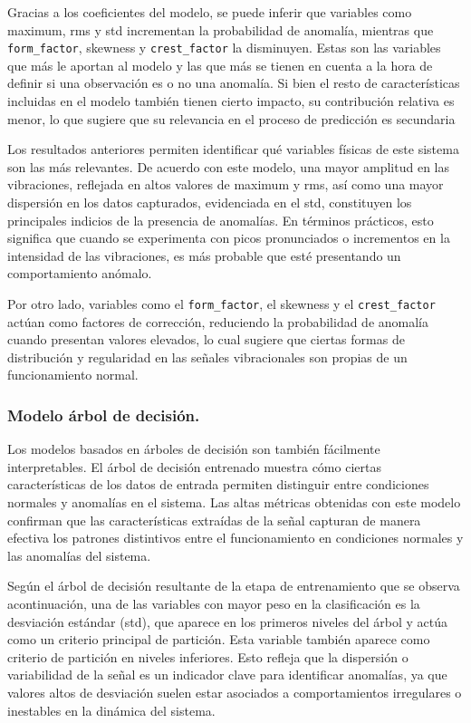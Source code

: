 \documentclass[11pt,a4paper,spanish]{book}
\numberwithin{equation}{chapter}
\numberwithin{figure}{chapter}
\begin{document}
Gracias a los coeficientes del modelo, se puede inferir que variables como maximum, rms 
y std incrementan la probabilidad de anomalía, mientras que \lstinline|form_factor|, 
skewness y \lstinline|crest_factor| la disminuyen. 
Estas son las variables que más le aportan al modelo y las que más se tienen en cuenta 
a la hora de definir si una observación es o no una anomalía. Si bien el resto de 
características incluidas en el modelo también tienen cierto impacto, su contribución 
relativa es menor, lo que sugiere que su relevancia en el proceso de predicción es 
secundaria


Los resultados anteriores permiten identificar qué variables físicas de este sistema son 
las más relevantes. De acuerdo con este modelo, una mayor amplitud en las vibraciones, 
reflejada en altos valores de maximum y rms, así como una mayor dispersión en los datos 
capturados, evidenciada en el std, constituyen los principales indicios de la presencia 
de anomalías. En términos prácticos, esto significa que cuando se experimenta con picos 
pronunciados o incrementos en la intensidad de las vibraciones, es más probable que esté 
presentando un comportamiento anómalo.


Por otro lado, variables como el \lstinline|form_factor|, el skewness y el 
\lstinline|crest_factor| actúan como factores de corrección, reduciendo la probabilidad 
de anomalía cuando presentan valores elevados, lo cual sugiere que ciertas formas de 
distribución y regularidad en las señales vibracionales son propias de un funcionamiento 
normal. 



\subsubsection{Modelo árbol de decisión.}

Los modelos basados en árboles de decisión son también fácilmente interpretables. 
El árbol de decisión entrenado muestra cómo ciertas características de los datos de 
entrada permiten distinguir entre condiciones normales y anomalías en el sistema. 
Las altas métricas obtenidas con este modelo confirman que las características extraídas 
de la señal capturan de manera efectiva los patrones distintivos entre el funcionamiento 
en condiciones normales y las anomalías del sistema.


Según el árbol de decisión resultante de la etapa de entrenamiento que se observa 
acontinuación, una de las variables con mayor peso en la clasificación es la desviación 
estándar (std), que aparece en los primeros niveles del árbol y actúa como un criterio 
principal de partición. Esta variable también aparece como criterio de partición en 
niveles inferiores. Esto refleja que la dispersión o variabilidad de la señal es un 
indicador clave para identificar anomalías, ya que valores altos de desviación suelen 
estar asociados a comportamientos irregulares o inestables en la dinámica del sistema.
\end{document}
